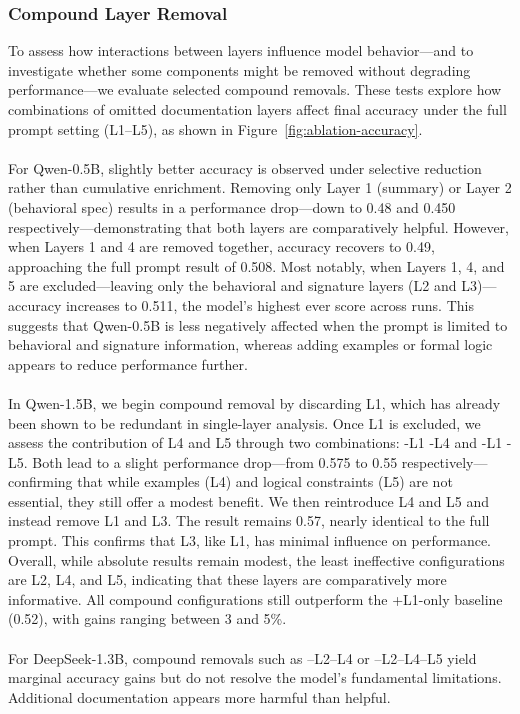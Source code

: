 \documentclass[a4paper]{usiinfbachelorproject}
\begin{document}
\subsubsection{Compound Layer Removal}

To assess how interactions between layers influence model behavior—and to investigate whether some components might be removed without degrading performance—we evaluate selected compound removals. These tests explore how combinations of omitted documentation layers affect final accuracy under the full prompt setting (L1–L5), as shown in Figure~\ref{fig:ablation-accuracy}. \\
\\
For Qwen-0.5B, slightly better accuracy is observed under selective reduction rather than cumulative enrichment. Removing only Layer 1 (summary) or Layer 2 (behavioral spec) results in a performance drop—down to 0.48 and 0.450 respectively—demonstrating that both layers are comparatively helpful. However, when Layers 1 and 4 are removed together, accuracy recovers to 0.49, approaching the full prompt result of 0.508. Most notably, when Layers 1, 4, and 5 are excluded—leaving only the behavioral and signature layers (L2 and L3)—accuracy increases to 0.511, the model's highest ever score across runs. This suggests that Qwen-0.5B is less negatively affected when the prompt is limited to behavioral and signature information, whereas adding examples or formal logic appears to reduce performance further. \\
\\
In Qwen-1.5B, we begin compound removal by discarding L1, which has already been shown to be redundant in single-layer analysis. Once L1 is excluded, we assess the contribution of L4 and L5 through two combinations: -L1 -L4 and -L1 -L5. Both lead to a slight performance drop—from 0.575 to 0.55 respectively—confirming that while examples (L4) and logical constraints (L5) are not essential, they still offer a modest benefit. We then reintroduce L4 and L5 and instead remove L1 and L3. The result remains 0.57, nearly identical to the full prompt. This confirms that L3, like L1, has minimal influence on performance. Overall, while absolute results remain modest, the least ineffective configurations are L2, L4, and L5, indicating that these layers are comparatively more informative. All compound configurations still outperform the +L1-only baseline (0.52), with gains ranging between 3 and 5\%.\\
\\
For DeepSeek-1.3B, compound removals such as –L2–L4 or –L2–L4–L5 yield marginal accuracy gains but do not resolve the model’s fundamental limitations. Additional documentation appears more harmful than helpful. \\
\end{document}
